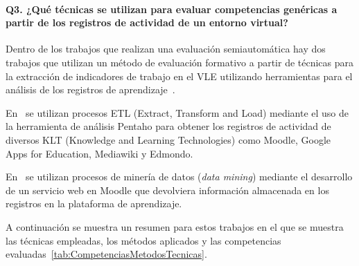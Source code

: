 \paragraph*{Q3. ¿Qué técnicas se utilizan para evaluar competencias genéricas a partir de los registros de actividad de un entorno virtual?}

Dentro de los trabajos que realizan una evaluación semiautomática hay dos trabajos que utilizan un método de evaluación formativo a partir de técnicas para la extracción de indicadores de trabajo en el VLE utilizando herramientas para el análisis de los registros de aprendizaje~\cite{rayon2014web,fidalgo:2015}. 

En~\cite{rayon2014web} se utilizan procesos ETL (Extract, Transform and Load) mediante el uso de la herramienta de análisis Pentaho para obtener los registros de actividad de diversos KLT (Knowledge and Learning Technologies) como Moodle, Google Apps for Education, Mediawiki y Edmondo.

En~\cite{fidalgo:2015} se utilizan procesos de minería de datos (\emph{data mining}) mediante el desarrollo de un servicio web en Moodle que devolviera información almacenada en los registros en la plataforma de aprendizaje.

A continuación se muestra un resumen para estos trabajos en el que se muestra las técnicas empleadas, los métodos aplicados y las competencias evaluadas~\ref{tab:CompetenciasMetodosTecnicas}.

